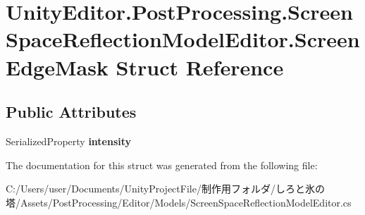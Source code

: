 \hypertarget{struct_unity_editor_1_1_post_processing_1_1_screen_space_reflection_model_editor_1_1_screen_edge_mask}{}\section{Unity\+Editor.\+Post\+Processing.\+Screen\+Space\+Reflection\+Model\+Editor.\+Screen\+Edge\+Mask Struct Reference}
\label{struct_unity_editor_1_1_post_processing_1_1_screen_space_reflection_model_editor_1_1_screen_edge_mask}
\subsection*{Public Attributes}
\begin{DoxyCompactItemize}
\item 
\mbox{\label{struct_unity_editor_1_1_post_processing_1_1_screen_space_reflection_model_editor_1_1_screen_edge_mask_a0ecb0b236d9e104886a56c40ac64b4f8}} 
Serialized\+Property {\bfseries intensity}
\end{DoxyCompactItemize}


The documentation for this struct was generated from the following file\+:\begin{DoxyCompactItemize}
\item 
C\+:/\+Users/user/\+Documents/\+Unity\+Project\+File/制作用フォルダ/しろと氷の塔/\+Assets/\+Post\+Processing/\+Editor/\+Models/Screen\+Space\+Reflection\+Model\+Editor.\+cs\end{DoxyCompactItemize}
